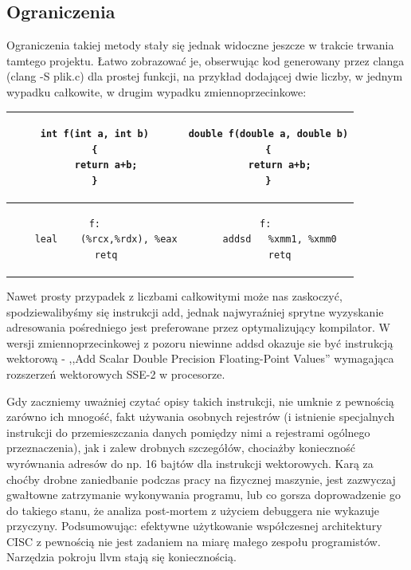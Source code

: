 \subsection{Ograniczenia}
Ograniczenia takiej metody stały się jednak widoczne jeszcze w trakcie trwania tamtego projektu. Łatwo zobrazować je, obserwując kod generowany przez clanga (clang -S plik.c) dla prostej funkcji, na przykład dodającej dwie liczby, w jednym wypadku całkowite, w drugim wypadku zmiennoprzecinkowe:
\begin{center}
\begin{tabular}{|c | c|}
\hline
\begin{lstlisting}
int f(int a, int b)
{
    return a+b;
}
\end{lstlisting}
&
\begin{lstlisting}
double f(double a, double b)
{
    return a+b;
}
\end{lstlisting}
\\ \hline
\begin{lstlisting}
f:
	leal	(%rcx,%rdx), %eax
	retq
\end{lstlisting}
&
\begin{lstlisting}
f: 
	addsd	%xmm1, %xmm0
	retq
\end{lstlisting}
\\ \hline
\end{tabular}
\end{center}
Nawet prosty przypadek z liczbami całkowitymi może nas zaskoczyć, spodziewalibyśmy się instrukcji add, jednak najwyraźniej sprytne wyzyskanie adresowania pośredniego jest preferowane przez optymalizujący kompilator. W wersji zmiennoprzecinkowej z pozoru niewinne addsd okazuje sie być instrukcją wektorową - ,,Add Scalar Double Precision Floating-Point Values''\cite{ADDSD_instr} wymagająca rozszerzeń wektorowych SSE-2 w procesorze. 

Gdy zaczniemy uważniej czytać opisy takich instrukcji, nie umknie z pewnością zarówno ich mnogość, fakt używania osobnych rejestrów (i istnienie specjalnych instrukcji do przemieszczania danych pomiędzy nimi a rejestrami ogólnego przeznaczenia), jak i zalew drobnych szczegółów, chociażby konieczność wyrównania adresów do np. 16 bajtów dla instrukcji wektorowych. Karą za choćby drobne zaniedbanie podczas pracy na fizycznej maszynie, jest zazwyczaj gwałtowne zatrzymanie wykonywania programu, lub co gorsza doprowadzenie go do takiego stanu, że analiza post-mortem z użyciem debuggera nie wykazuje przyczyny. Podsumowując: efektywne użytkowanie współczesnej architektury CISC z pewnością nie jest zadaniem na miarę małego zespołu programistów. Narzędzia pokroju llvm  stają się koniecznością.


